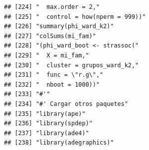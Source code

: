 \documentclass[11pt,]{article}
\begin{document}
\begin{verbatim}
## [224] "  max.order = 2,"                                                                                                                                                      
## [225] "  control = how(nperm = 999))"                                                                                                                                         
## [226] "summary(phi_ward_k2)"                                                                                                                                                  
## [227] "colSums(mi_fam)"                                                                                                                                                       
## [228] "(phi_ward_boot <- strassoc("                                                                                                                                           
## [229] "  X = mi_fam,"                                                                                                                                                         
## [230] "  cluster = grupos_ward_k2,"                                                                                                                                           
## [231] "  func = \"r.g\","                                                                                                                                                     
## [232] "  nboot = 1000))"                                                                                                                                                      
## [233] "#'"                                                                                                                                                                    
## [234] "#' Cargar otros paquetes"                                                                                                                                              
## [235] "library(ape)"                                                                                                                                                          
## [236] "library(spdep)"                                                                                                                                                        
## [237] "library(ade4)"                                                                                                                                                         
## [238] "library(adegraphics)"                                                                                                                                                  

\end{verbatim}
\end{document}
